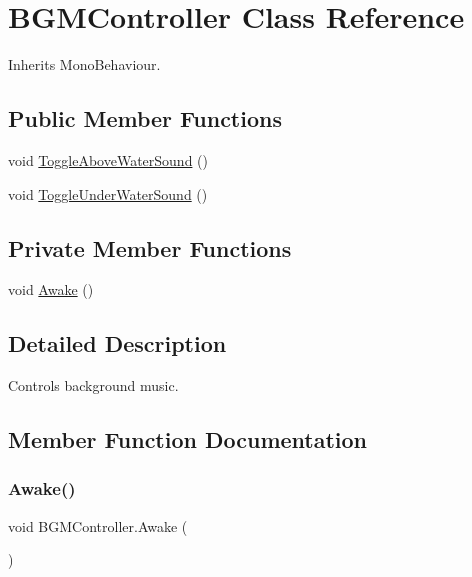\hypertarget{class_b_g_m_controller}{}\section{B\+G\+M\+Controller Class Reference}
\label{class_b_g_m_controller}


Inherits Mono\+Behaviour.

\subsection*{Public Member Functions}
\begin{DoxyCompactItemize}
\item 
void \hyperlink{class_b_g_m_controller_afe57a67a897f90d66a636c55bd5801ac}{Toggle\+Above\+Water\+Sound} ()
\item 
void \hyperlink{class_b_g_m_controller_aeba3eaf3dfafbbd774a7910569f858b0}{Toggle\+Under\+Water\+Sound} ()
\end{DoxyCompactItemize}
\subsection*{Private Member Functions}
\begin{DoxyCompactItemize}
\item 
void \hyperlink{class_b_g_m_controller_a98751ed946ac8b99540a0173227850f0}{Awake} ()
\end{DoxyCompactItemize}


\subsection{Detailed Description}
Controls background music. 



\subsection{Member Function Documentation}
\mbox{\label{class_b_g_m_controller_a98751ed946ac8b99540a0173227850f0}} 
\subsubsection{\texorpdfstring{Awake()}{Awake()}}
{\footnotesize\ttfamily void B\+G\+M\+Controller.\+Awake (\begin{DoxyParamCaption}{ }\end{DoxyParamCaption})\hspace{0.3cm}{\ttfamily [private]}}



